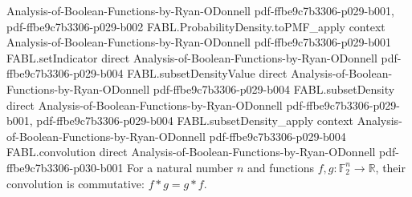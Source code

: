 \begin{theorem}
  {Analysis-of-Boolean-Functions-by-Ryan-ODonnell}
  {pdf-ffbe9c7b3306-p029-b001,
    pdf-ffbe9c7b3306-p029-b002}
\proofstep
  {FABL.ProbabilityDensity.toPMF_apply}
  {context}
  {Analysis-of-Boolean-Functions-by-Ryan-ODonnell}
  {pdf-ffbe9c7b3306-p029-b001}
\proofstep
  {FABL.setIndicator}
  {direct}
  {Analysis-of-Boolean-Functions-by-Ryan-ODonnell}
  {pdf-ffbe9c7b3306-p029-b004}
\proofstep
  {FABL.subsetDensityValue}
  {direct}
  {Analysis-of-Boolean-Functions-by-Ryan-ODonnell}
  {pdf-ffbe9c7b3306-p029-b004}
\proofstep
  {FABL.subsetDensity}
  {direct}
  {Analysis-of-Boolean-Functions-by-Ryan-ODonnell}
  {pdf-ffbe9c7b3306-p029-b001,
    pdf-ffbe9c7b3306-p029-b004}
\proofstep
  {FABL.subsetDensity_apply}
  {context}
  {Analysis-of-Boolean-Functions-by-Ryan-ODonnell}
  {pdf-ffbe9c7b3306-p029-b004}
\proofstep
  {FABL.convolution}
  {direct}
  {Analysis-of-Boolean-Functions-by-Ryan-ODonnell}
  {pdf-ffbe9c7b3306-p030-b001}
For a natural number $n$ and functions $f,g:\mathbb{F}_2^n\to\mathbb{R}$, their
convolution is commutative: $f*g=g*f$.
\end{theorem}

